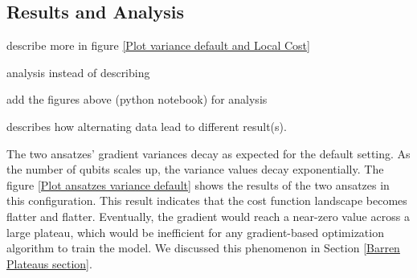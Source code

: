 \subsection{Results and Analysis} \label{Result section}

\begin{todolist}
    \item describe more in figure \ref{Plot variance default and Local Cost}
    \item analysis instead of describing
    \item add the figures above (python notebook) for analysis
    \item describes how alternating data lead to different result(s).
\end{todolist}

The two ansatzes' gradient variances decay as expected for the default setting.
As the number of qubits scales up, the variance values decay exponentially.
The figure \ref{Plot ansatzes variance default} shows the results of the two ansatzes in this configuration.
This result indicates that the cost function landscape becomes flatter and flatter.
Eventually, the gradient would reach a near-zero value across a large plateau, which would be inefficient for any gradient-based optimization algorithm to train the model.
We discussed this phenomenon in Section \ref{Barren Plateaus section}.


